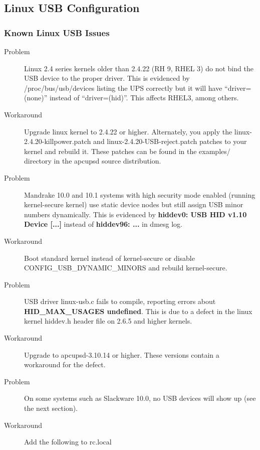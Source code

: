 \subsection*{Linux USB Configuration}

\subsubsection*{Known Linux USB Issues}

\begin{description}
\item [Problem]
Linux 2.4 series kernels older than 2.4.22 (RH 9, RHEL 3) do not bind the
USB device to the proper driver. This is evidenced by /proc/bus/usb/devices
listing the UPS correctly but it will have ``driver=(none)'' instead of
``driver=(hid)''. This affects RHEL3, among others.  
\item [Workaround]
Upgrade linux kernel to 2.4.22 or higher. Alternately, you apply the
linux-2.4.20-killpower.patch and linux-2.4.20-USB-reject.patch patches
to your kernel and rebuild it. These patches can be found in the examples/
directory in the apcupsd source distribution.

\item [Problem]
Mandrake 10.0 and 10.1 systems with high security mode
enabled (running kernel-secure kernel) use static device nodes but still
assign USB minor numbers dynamically. This is evidenced by {\bf hiddev0: USB
HID v1.10 Device [...]} instead of {\bf hiddev96: ...} in dmesg log.  
\item [Workaround]
Boot standard kernel instead of kernel-secure or disable
CONFIG\_USB\_DYNAMIC\_MINORS and rebuild kernel-secure.  

\item [Problem]
USB driver linux-usb.c fails to compile, reporting errors
about {\bf HID\_MAX\_USAGES undefined}. This is due to a defect in the linux
kernel hiddev.h header file on 2.6.5 and higher kernels.  
\item [Workaround]
Upgrade to apcupsd-3.10.14 or higher. These versions contain a workaround 
for the defect.  

\item [Problem]
On some systems such as Slackware 10.0, no USB devices will
show up (see the next section).  
\item [Workaround]
Add the following to rc.local 


\end{description}
